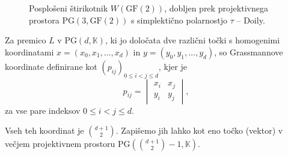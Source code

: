 \documentclass[fin1, tisk]{fmfdelo}
\newcommand{\PG}{\mathrm{PG}}
\newcommand{\GF}{\mathrm{GF}}
\begin{document}
\begin{figure}[htbp]
    \centering
    \caption{Posplošeni štirikotnik $W(\GF(2))$, dobljen prek projektivnega prostora $\PG(3, \GF(2))$
    s simplektično polarnostjo $\tau$ -- Doily.}
    \label{fig:doily_simplekticni}
\end{figure}



\begin{definicija}\label{def:grassmannove_koordinate}
    Za premico $L$ v $\PG(d, \mathbb{K})$, ki jo določata dve različni točki s 
    homogenimi koordinatami $x = (x_0, x_1, \dots, x_d)$ in $y = (y_0, y_1, \dots, y_d)$,
    so Grassmannove koordinate definirane kot $(p_{ij})_{0\leq i < j \leq d}$, kjer je
    \[p_{ij} = \begin{vmatrix} x_i & x_j \\ y_i & y_j \end{vmatrix},\]
    za vse pare indeksov $0 \leq i < j \leq d$.
\end{definicija}

\begin{opomba}\label{op:grassmann_stevilo}
    Vseh teh koordinat je $\binom{d+1}{2}$. Zapišemo jih lahko kot eno točko (vektor)
    v večjem projektivnem prostoru $\PG\left(\binom{d+1}{2} - 1, \mathbb{K}\right)$.
\end{opomba}
\end{document}
